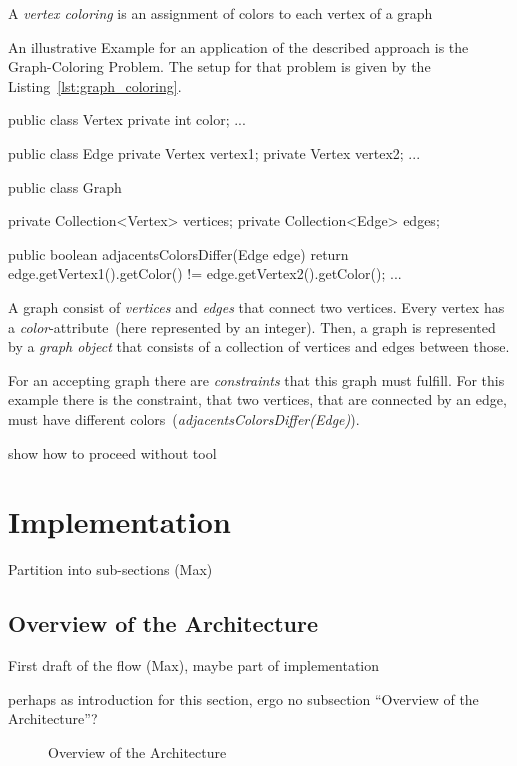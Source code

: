 \documentclass[conference]{IEEEtran}
\begin{document}
A \emph{vertex coloring} is an assignment of colors to each vertex of a graph

An illustrative Example for an application of the described approach is the
Graph-Coloring Problem. The setup for that problem is given by the
Listing~\ref{lst:graph_coloring}.

\begin{javalisting}[label=lst:graph_coloring,caption=Example]
public class Vertex {
  private int color;
  ...
}

public class Edge {
  private Vertex vertex1;
  private Vertex vertex2;
  ...
}

public class Graph {
  private Collection<Vertex> vertices;
  private Collection<Edge> edges;

  public boolean adjacentsColorsDiffer(Edge edge) {
    return edge.getVertex1().getColor() != edge.getVertex2().getColor();
  }
  ...
}
\end{javalisting}

A graph consist of \emph{vertices} and \emph{edges} that connect two vertices.
Every vertex has a \emph{color}-attribute~(here represented by an integer).
Then, a graph is represented by a \emph{graph object} that consists of a
collection of vertices and edges between those.

For an accepting graph there are \emph{constraints} that this graph must
fulfill. For this example there is the constraint, that two vertices, that are
connected by an edge, must have different
colors~(\emph{adjacentsColorsDiffer(Edge)}).

\danger show how to proceed without tool

\section{Implementation}
\label{sec:implementation}

\danger Partition into sub-sections (Max)

\subsection{Overview of the Architecture}
\label{sec:impl_overv-arch}

\danger First draft of the flow (Max), maybe part of implementation

\danger perhaps as introduction for this section, ergo no subsection ``Overview
of the Architecture''?

\begin{figure*}[!ht]
  \centering
  \label{fig:architecture}
  \tikzarchitecture
  \caption{Overview of the Architecture}
\end{figure*}
\end{document}
